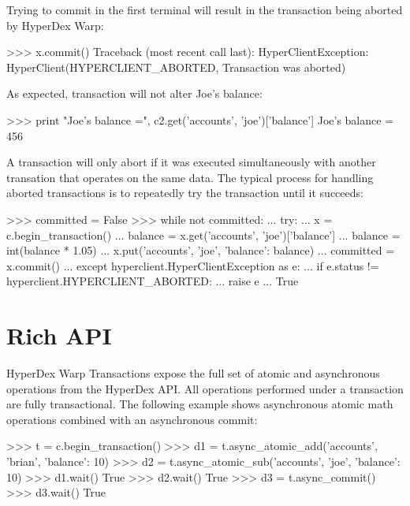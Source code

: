 Trying to commit  in the first terminal will result in the transaction
being aborted by HyperDex Warp:

\begin{pyconcode}
>>> x.commit()
Traceback (most recent call last):
HyperClientException: HyperClient(HYPERCLIENT_ABORTED, Transaction was aborted)
\end{pyconcode}

As expected, transaction  will not alter Joe's balance:

\begin{pyconcode}
>>> print "Joe's balance =", c2.get('accounts', 'joe')['balance']
Joe's balance = 456
\end{pyconcode}

A transaction will only abort if it was executed simultaneously with another
transation that operates on the same data.  The typical process for handling
aborted transactions is to repeatedly try the transaction until it succeeds:

\begin{pyconcode}
>>> committed = False
>>> while not committed:
...     try:
...         x = c.begin_transaction()
...         balance = x.get('accounts', 'joe')['balance']
...         balance = int(balance * 1.05)
...         x.put('accounts', 'joe', {'balance': balance})
...         committed = x.commit()
...     except hyperclient.HyperClientException as e:
...         if e.status != hyperclient.HYPERCLIENT_ABORTED:
...             raise e
...
True
\end{pyconcode}

\section{Rich API}
\label{sec:transactions:API}

HyperDex Warp Transactions expose the full set of atomic and asynchronous
operations from the HyperDex API.  All operations performed under a transaction
are fully transactional.  The following example shows asynchronous atomic math
operations combined with an asynchronous commit:

\begin{pyconcode}
>>> t = c.begin_transaction()
>>> d1 = t.async_atomic_add('accounts', 'brian', {'balance': 10})
>>> d2 = t.async_atomic_sub('accounts', 'joe', {'balance': 10})
>>> d1.wait()
True
>>> d2.wait()
True
>>> d3 = t.async_commit()
>>> d3.wait()
True
\end{pyconcode}

